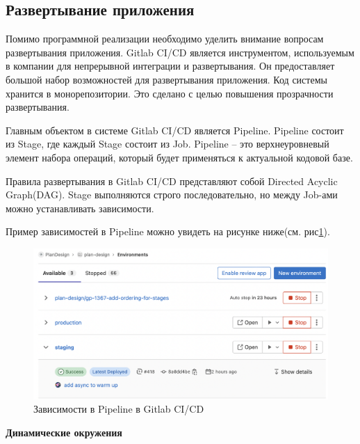 \subsection{\large{Развертывание приложения}}

Помимо программной реализации необходимо уделить внимание вопросам развертывания приложения.
Gitlab CI/CD является инструментом, используемым в компании для непрерывной интеграции и развертывания.
Он предоставляет большой набор возможностей для развертывания приложения.
Код системы хранится в монорепозитории.
Это сделано с целью повышения прозрачности развертывания.

Главным объектом в системе Gitlab CI/CD является Pipeline.
Pipeline состоит из Stage, где каждый Stage состоит из Job.
Pipeline -- это верхнеуровневый элемент набора операций,
который будет применяться к актуальной кодовой базе.

Правила развертывания в Gitlab CI/CD представляют собой Directed Acyclic Graph(DAG).
Stage выполняются строго последовательно, но между Job-ами можно устанавливать зависимости.

Пример зависимостей в Pipeline можно увидеть на рисунке ниже(см. рис\ref{pic:implementation__deployment-dependencies}).
\begin{figure}[H]
	\includegraphics[width=\textwidth]{implementation/pictures/deployment/environment}
	\caption{Зависимости в Pipeline в Gitlab CI/CD}
	\label{pic:implementation__deployment-dependencies}
\end{figure}
\vskip 10mm

\noindent \textbf{Динамические окружения}


